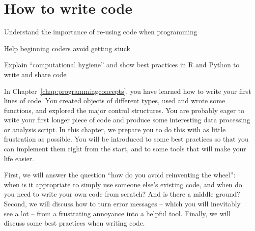 \chapter{How to write code}
\label{chap:worldcode}

\begin{abstract}{Abstract}
Programming is no longer a solitary activity, and almost all questions, problems, and error messages have been encountered and solved before. This chapter explains the most common forms of collaboration and sources of outside help, as well as outlining best practice on how to write and share code yourself.
\end{abstract}


\begin{objectives}
\item Understand the importance of re-using code when programming
\item Help beginning coders avoid getting stuck
\item Explain ``computational hygiene'' and show best practices in R and Python to write and share code
\end{objectives}

In Chapter~\ref{chap:programmingconcepts}, you have learned how to write
your first lines of code.  You created objects of different types,
used and wrote some functions, and explored the major control structures.
You are probably eager to write your first longer piece of code and
produce some interesting data processing or analysis script. In this
chapter, we prepare you to do this with as little frustration as possible.
You will be introduced to some best practices so that you can implement
them right from the start, and to some tools that will make your life easier.

First, we will answer the question ``how do you avoid reinventing
the wheel'': when is it appropriate to simply use someone else's existing code, and
when do you need to write your own code from scratch? And is there a middle ground?
Second, we will discuss how to turn error messages -- which you will inevitably
see a lot -- from a frustrating annoyance into a helpful tool.
Finally, we will discuss some best practices when writing code.

